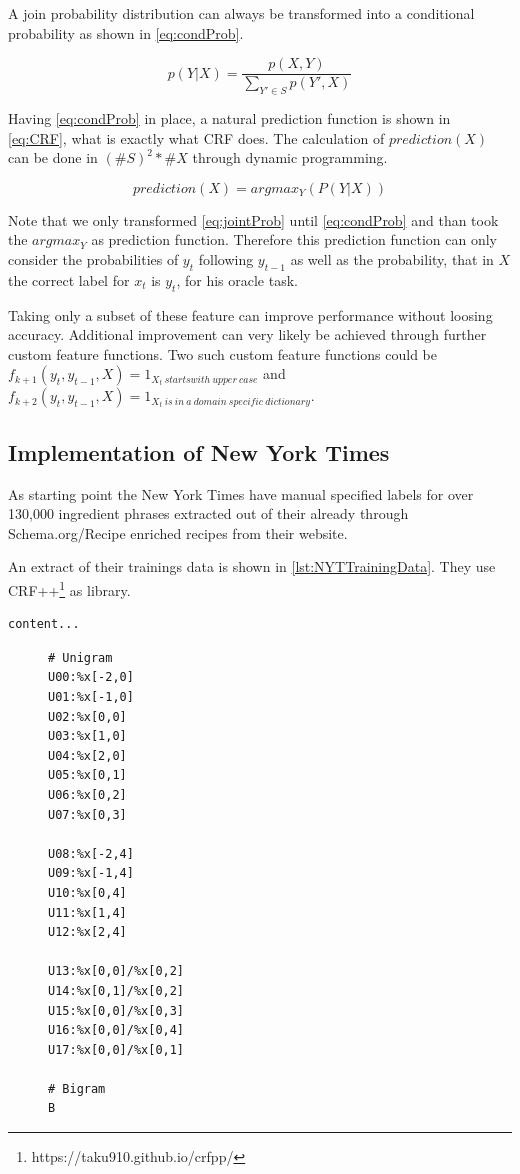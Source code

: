 \documentclass[12pt, twoside]{report}
\begin{document}
A join probability distribution can always be transformed into a conditional probability as shown in \cref{eq:condProb}.

\begin{equation}\label{eq:condProb}
p(Y|X) = \frac{p(X,Y)}{\sum_{Y'\in S}^{}p(Y', X)}
\end{equation}

Having \cref{eq:condProb} in place, a natural prediction function is shown in \cref{eq:CRF}, what is exactly what CRF does. The calculation of $prediction(X)$ can be done in $(\#S)^2*\#X$ through dynamic programming.

\begin{equation}\label{eq:CRF}
prediction(X) = argmax_Y(P(Y|X))
\end{equation}

Note that we only transformed \cref{eq:jointProb} until \cref{eq:condProb} and than took the $argmax_Y$ as prediction function. Therefore this prediction function can only consider the probabilities of $y_t$ following $y_{t-1}$ as well as the probability, that in $X$ the correct label for $x_t$ is $y_t$, for his oracle task.

Taking only a subset of these feature can improve performance without loosing accuracy. Additional improvement can very likely be achieved through further custom feature functions. Two such custom feature functions could be $f_{k+1}(y_t, y_{t-1}, X) = 1_{X_t\ starts with\ upper\ case}$ and \\ $f_{k+2}(y_t, y_{t-1}, X) = 1_{X_t\ is\ in\ a\ domain\ specific\ dictionary}$.

\subsection{Implementation of New York Times}
As starting point the New York Times have manual specified labels for over 130,000 ingredient phrases extracted out of their already through Schema.org/Recipe enriched recipes from their website.

An extract of their trainings data is shown in \cref{lst:NYTTrainingData}. They use CRF++\footnote{https://taku910.github.io/crfpp/} as library.

\begin{lstlisting}[frame=single, caption={Extract of the training data for New York Times CRF}, label=lst:NYTTrainingData]
content...
\end{lstlisting}

\begin{figure}
\begin{lstlisting}[frame=single, caption={Feature templates for New York Times CRF}, label=lst:NYTfeatureTemplates]
# Unigram
U00:%x[-2,0]
U01:%x[-1,0]
U02:%x[0,0]
U03:%x[1,0]
U04:%x[2,0]
U05:%x[0,1]
U06:%x[0,2]
U07:%x[0,3]

U08:%x[-2,4]
U09:%x[-1,4]
U10:%x[0,4]
U11:%x[1,4]
U12:%x[2,4]

U13:%x[0,0]/%x[0,2]
U14:%x[0,1]/%x[0,2]
U15:%x[0,0]/%x[0,3]
U16:%x[0,0]/%x[0,4]
U17:%x[0,0]/%x[0,1]

# Bigram
B
\end{lstlisting}
\end{figure}
 
\end{document}
